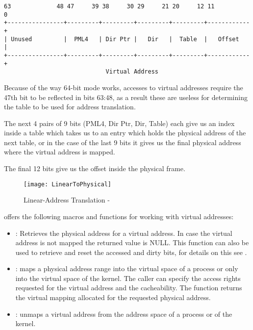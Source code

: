 \begin{appendices}
\begin{verbatim}
63             48 47     39 38     30 29     21 20     12 11          0
+----------------+---------+---------+---------+---------+------------+
| Unused         |  PML4   | Dir Ptr |   Dir   |  Table  |   Offset   |
+----------------+---------+---------+---------+---------+------------+
                             Virtual Address
\end{verbatim}

Because of the way 64-bit mode works, accesses to virtual addresses require the 47th bit to be
reflected in bits 63:48, as a result these are useless for determining the table to be used for
address translation.

The next 4 pairs of 9 bits (PML4, Dir Ptr, Dir, Table) each give us an index inside a table which
takes us to an entry which holds the physical address of the next table, or in the case of the last
9 bits it gives us the final physical address where the virtual address is mapped.

The final 12 bits give us the offset inside the physical frame.

\begin{figure}
	\centering
	\texttt{[image: LinearToPhysical]}
		\caption{Linear-Address Translation - \cite{intelSys}}
	\label{fig:VaToPa}
\end{figure}

\projectname offers the following macros and functions for working with virtual addresses:

\begin{itemize}
	\item {}: Retrieves the physical address for a virtual address. In
case the virtual address is not mapped the returned value is NULL. This function can also be used
to retrieve and reset the accessed and dirty bits, for details on this see .

	\item {}: maps a physical address range into the virtual space of a process 
or only into the virtual space of the kernel. The caller can specify the access rights requested for
the virtual address and the cacheability. The function returns the virtual mapping allocated for the
requested physical address.

	\item {}: unmaps a virtual address from the address space of a process or
of the kernel.


\end{itemize}
\end{appendices}
